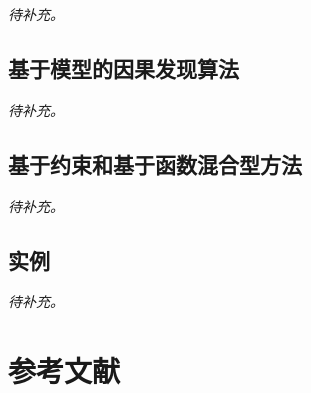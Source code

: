 \documentclass[
  chinese-hans,
  letterpaper,
  DIV=11,
  numbers=noendperiod]{scrreprt}
\begin{document}
\emph{待补充。}

\section{基于模型的因果发现算法}\label{ux57faux4e8eux6a21ux578bux7684ux56e0ux679cux53d1ux73b0ux7b97ux6cd5}

\emph{待补充。}

\section{基于约束和基于函数混合型方法}\label{ux57faux4e8eux7ea6ux675fux548cux57faux4e8eux51fdux6570ux6df7ux5408ux578bux65b9ux6cd5}

\emph{待补充。}

\section{实例}\label{ux5b9eux4f8b}

\emph{待补充。}


\chapter*{参考文献}\label{ux53c2ux8003ux6587ux732e-14}

\end{document}
